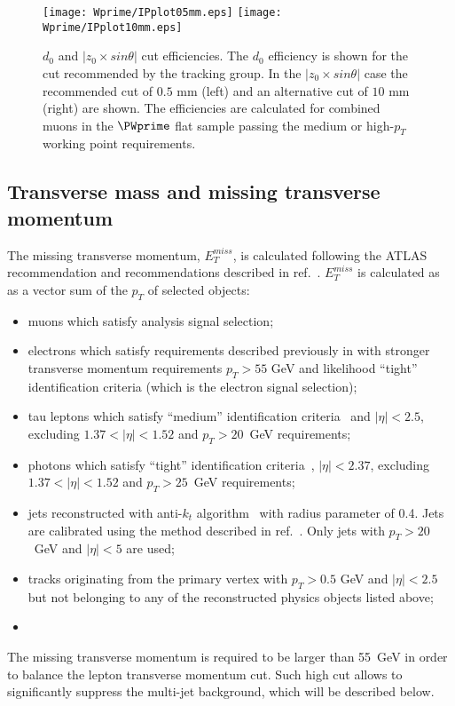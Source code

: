 \begin{figure}[]
  \centering
  \texttt{[image: Wprime/IPplot05mm.eps]}
  \texttt{[image: Wprime/IPplot10mm.eps]}
  \caption{$d_{0}$ and $|z_0 \times sin \theta|$ cut efficiencies. The $d_{0}$ efficiency is shown for the cut recommended by the tracking group. In the $|z_0 \times sin \theta|$ case the recommended cut of $0.5$ mm (left) and an alternative cut of $10$ mm (right) are shown. The efficiencies are calculated for combined muons in the
$\PWprime$ flat sample passing the medium or high-$p_T$ working point requirements.}
  \label{fig:Muon_LepVtxEff}
\end{figure}


\subsection{Transverse mass and missing transverse momentum}
\label{subsec:etmiss}
The missing transverse momentum, $E_T^{miss}$, is calculated following the ATLAS recommendation and recommendations described in ref.~\cite{met2015_1,met2015_2}.
$E_T^{miss}$ is calculated as as a vector sum of the $p_T$ of selected objects:
\begin{itemize}
 \item muons which satisfy analysis signal selection;
 \item electrons which satisfy requirements described previously in
  with stronger transverse momentum requirements $p_T > 55$ GeV
 and likelihood ``tight'' identification criteria (which is the electron signal selection);
 \item tau leptons which satisfy ``medium'' identification criteria~\cite{tau_id_8TeV} and $|\eta| < 2.5$, excluding  $1.37 < |\eta| < 1.52$ and $p_T > 20$~GeV requirements;
 \item photons which satisfy ``tight'' identification criteria~\cite{photon_id_2011}, $|\eta| < 2.37$, excluding  $1.37 < |\eta| < 1.52$ and $p_T > 25$~GeV requirements;
 \item jets reconstructed with anti-$k_t$ algorithm~\cite{jet_anti_kt} with radius parameter of 0.4.
 Jets are calibrated using the method described in ref.~\cite{jet_calib_syst_13TeV}.
 Only jets with $p_T > 20$~GeV and $|\eta| < 5$ are used;
 \item tracks originating from the primary vertex with $p_T > 0.5$ GeV and $|\eta| < 2.5$ but not belonging to any of the reconstructed physics objects listed above;
 \item {}
\end{itemize}
The missing transverse momentum is required to be larger than 55~GeV in order 
to balance the lepton transverse momentum cut.
Such high cut allows to significantly suppress 
the multi-jet background, which will be described below.

